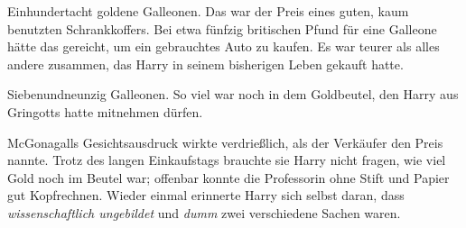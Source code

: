 Einhundertacht goldene Galleonen. Das war der Preis eines guten, kaum benutzten Schrankkoffers. Bei etwa fünfzig britischen Pfund für eine Galleone hätte das gereicht, um ein gebrauchtes Auto zu kaufen. Es war teurer als alles andere zusammen, das Harry in seinem bisherigen Leben gekauft hatte.

Siebenundneunzig Galleonen. So viel war noch in dem Goldbeutel, den Harry aus Gringotts hatte mitnehmen dürfen.

McGonagalls Gesichtsausdruck wirkte verdrießlich, als der Verkäufer den Preis nannte. Trotz des langen Einkaufstags brauchte sie Harry nicht fragen, wie viel Gold noch im Beutel war; offenbar konnte die Professorin ohne Stift und Papier gut Kopfrechnen. Wieder einmal erinnerte Harry sich selbst daran, dass \emph{wissenschaftlich ungebildet} und \emph{dumm} zwei verschiedene Sachen waren.

